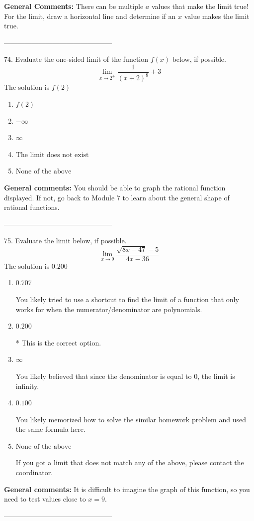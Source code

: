 \documentclass{extbook}[14pt]
\begin{document}
\textbf{General Comments:} There can be multiple $a$ values that make the limit true! For the limit, draw a horizontal line and determine if an $x$ value makes the limit true.

-----------------------------------------------

74. Evaluate the one-sided limit of the function $f(x)$ below, if possible.
\[ \lim_{x \rightarrow 2^+} \frac{1}{(x+2)^8}+3 \] 
The solution is $ f(2) $ 

\begin{enumerate}[label=\Alph*.] 
\item $ f(2) $ 

  
\item $ -\infty $ 

  
\item $ \infty $ 

  
\item $ \text{The limit does not exist} $ 

  
\item $ \text{None of the above} $ 

  
\end{enumerate} 
 
\textbf{General comments:} You should be able to graph the rational function displayed. If not, go back to Module 7 to learn about the general shape of rational functions.

-----------------------------------------------

75. Evaluate the limit below, if possible.
\[ \lim_{x \rightarrow 9} \frac{\sqrt{8x - 47} - 5}{4x - 36} \] 
The solution is $ 0.200 $ 

\begin{enumerate}[label=\Alph*.] 
\item $ 0.707 $ 

 You likely tried to use a shortcut to find the limit of a function that only works for when the numerator/denominator are polynomials. 
\item $ 0.200 $ 

 * This is the correct option. 
\item $ \infty $ 

 You likely believed that since the denominator is equal to 0, the limit is infinity. 
\item $ 0.100 $ 

 You likely memorized how to solve the similar homework problem and used the same formula here. 
\item $ \text{None of the above} $ 

 If you got a limit that does not match any of the above, please contact the coordinator. 
\end{enumerate} 
 
\textbf{General comments:} It is difficult to imagine the graph of this function, so you need to test values close to $x = 9$.

-----------------------------------------------
\end{document}
